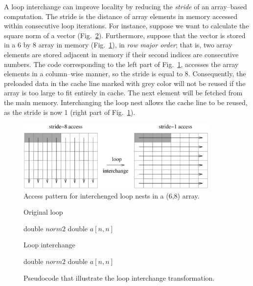 A loop interchange can improve locality by reducing the \textit{stride} of an array--based computation. The stride is the distance of array elements in memory accessed within consecutive loop iterations. For instance, suppose we want to calculate the square norm of a vector (Fig.~\ref{algo:loop-interchange}). Furthermore, suppose that the vector is stored in a 6 by 8 array in memory (Fig.~\ref{fig:interchanged-loop-nests}), in \textit{row major order}; that is, two array elements are stored adjacent in memory if their second indices are consecutive numbers. The code corresponding to the left part of Fig.~\ref{fig:interchanged-loop-nests}, accesses the array elements in a column--wise manner, so the stride is equal to 8. Consequently, the preloaded data in the cache line marked with grey color will not be reused if the array is too large to fit entirely in cache. The next element will be fetched from the main memory. Interchanging the loop nest allows the cache line to be reused, as the stride is now 1 (right part of Fig.~\ref{fig:interchanged-loop-nests}). \\
\begin{figure}[h]
   \centering
   \includegraphics[width=10cm]{Figs/Interchanged_loop_nests.eps}
   \caption{Access pattern for interchenged loop nests in a (6,8) array.} \label{fig:interchanged-loop-nests}
\end{figure} 

\begin{figure}[t!]
\begin{minipage}[t]{6.5cm}
\null
\begin{algorithm}[H]
\caption{Original loop} 
\SetAlgoLined
double $norm2$\;
double $a[n,n]$\;
\end{algorithm}
\end{minipage}%
\begin{minipage}[t]{6.5cm}
\null
\begin{algorithm}[H]
\caption{Loop interchange} 
\SetAlgoLined
double $norm2$\;
double $a[n,n]$\;
\end{algorithm}
\end{minipage}
\caption{Pseudocode that illustrate the loop interchange transformation.} \label{algo:loop-interchange}
\end{figure}

